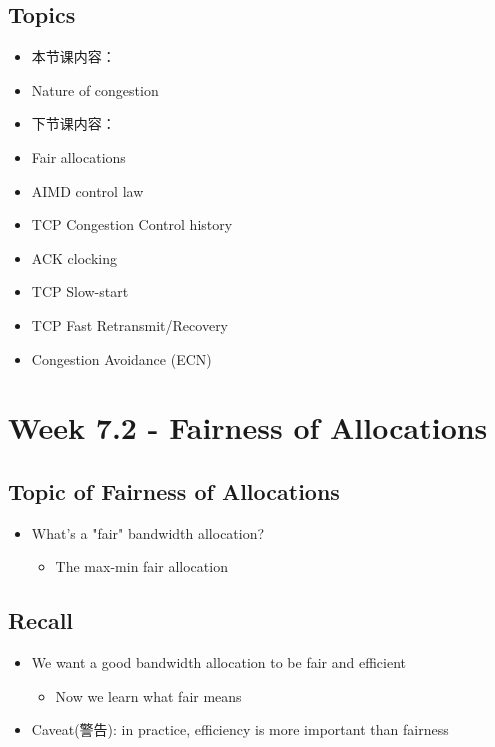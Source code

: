 \documentclass[12pt]{ctexart}   %
\begin{document}
	\subsection{Topics}
	\begin{itemize}
		\item {\color{red} 本节课内容：}
		\item Nature of congestion
		
		\item {\color{red} 下节课内容：}
		\item Fair allocations
		\item AIMD control law
		\item TCP Congestion Control history
		\item ACK clocking
		\item TCP Slow-start
		\item TCP Fast Retransmit/Recovery
		\item Congestion Avoidance (ECN)
	\end{itemize}
	
\section{Week 7.2 - Fairness of Allocations}	
	\subsection{Topic of Fairness of Allocations}
	\begin{itemize}
		\item What's a "fair" bandwidth allocation?
		\begin{itemize}
			\item The max-min fair allocation
		\end{itemize}
	\end{itemize}
	
	\subsection{Recall}
	\begin{itemize}
		\item We want a good bandwidth allocation to be fair and efficient
		\begin{itemize}
			\item Now we learn what fair means
		\end{itemize}
		
		\item Caveat(警告): in practice, efficiency is more important than fairness
	\end{itemize}
	
\end{document}
